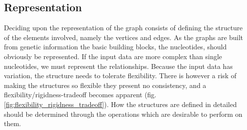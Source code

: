 \documentclass[thesis.tex]{subfiles}
\begin{document}
\subsection{Representation}
Deciding upon the representation of the graph consists of defining the structure of the elements involved, namely the vertices and edges. As the graphs are built from genetic information the basic building blocks, the nucleotides, should obviously be represented. If the input data are more complex than single nucleotides, we must represent the relationships. Because the input data has variation, the structure needs to tolerate flexibility. There is however a risk of making the structures so flexible they present no consistency, and a flexibility/rigidness-tradeoff becomes apparent (fig. \ref{fig:flexibility_rigidness_tradeoff}). How the structures are defined in detailed should be determined through the operations which are desirable to perform on them.\\
\par\noindent
\end{document}
